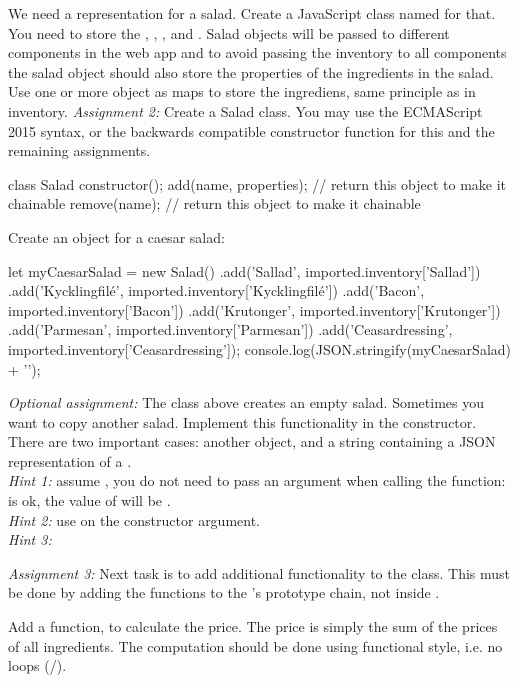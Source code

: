 \documentclass[fleqn, article, a4paper]{memoir}
\begin{document}
\begin{Assignments}
\item We need a representation for a salad. Create a JavaScript class named  for that. You need to store the , , , and . Salad objects will be passed to different components in the web app and to avoid passing the inventory to all components the salad object should also store the properties of the ingredients in the salad. Use one or more object as maps to store the ingrediens, same principle as in inventory. 
\emph{Assignment 2:} Create a Salad class. You may use the ECMAScript 2015  syntax, or the backwards compatible constructor function for this and the remaining assignments.
\begin{Code}
class Salad {
  constructor();
  add(name, properties);  // return this object to make it chainable
  remove(name);           // return this object to make it chainable
}
\end{Code}
Create an object for a caesar salad:
\begin{Code}
let myCaesarSalad = new Salad()
.add('Sallad', imported.inventory['Sallad'])
.add('Kycklingfilé', imported.inventory['Kycklingfilé'])
.add('Bacon', imported.inventory['Bacon'])
.add('Krutonger', imported.inventory['Krutonger'])
.add('Parmesan', imported.inventory['Parmesan'])
.add('Ceasardressing', imported.inventory['Ceasardressing']);
console.log(JSON.stringify(myCaesarSalad) + '\n');
\end{Code}
\emph{Optional assignment:} The class above creates an empty salad. Sometimes you want to copy another salad. Implement this functionality in the constructor. There are two important cases: another  object, and a string containing a JSON representation of a . 
\\\emph{Hint 1:} assume , you do not need to pass an argument when calling the function:  is ok, the value of  will be .
\\\emph{Hint 2:} use  on the constructor argument. 
\\\emph{Hint 3:} 
\item \emph{Assignment 3:} Next task is to add additional functionality to the  class. This must be done by adding the functions to the 's prototype chain, not inside .

Add a function,  to calculate the price. The price is simply the sum of the prices of all ingredients. The computation should be done using functional style, i.e. no loops (/). 


\end{Assignments}
\end{document}

